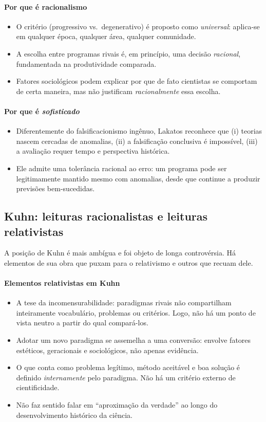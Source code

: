 \documentclass[9pt,a4paper]{extarticle}
\newcommand{\impt}[1]{\textcolor{important}{#1}}
\newcommand{\ntc}[1]{\textcolor{notice}{#1}}
\begin{document}
\paragraph{Por que é racionalismo}
\begin{itemize}
    \item O critério (progressivo vs.\ degenerativo) é proposto como \emph{universal}: aplica-se em qualquer época, qualquer área, qualquer comunidade.
    \item A escolha entre programas rivais é, em princípio, uma decisão \emph{racional}, fundamentada na produtividade comparada.
    \item Fatores sociológicos podem explicar por que de fato cientistas se comportam de certa maneira, mas não justificam \emph{racionalmente} essa escolha.
\end{itemize}

\paragraph{Por que é \emph{sofisticado}}
\begin{itemize}
    \item Diferentemente do falsificacionismo ingênuo, Lakatos reconhece que (i) teorias nascem cercadas de anomalias, (ii) a falsificação conclusiva é impossível, (iii) a avaliação requer tempo e perspectiva histórica.
    \item Ele admite uma \ntc{tolerância racional} ao erro: um programa pode ser legitimamente mantido mesmo com anomalias, desde que continue a produzir previsões bem-sucedidas.
\end{itemize}

\subsection{Kuhn: leituras racionalistas e leituras relativistas}

A posição de Kuhn é mais ambígua e foi objeto de longa controvérsia. Há elementos de sua obra que puxam para o relativismo e outros que recuam dele.

\paragraph{Elementos relativistas em Kuhn}
\begin{itemize}
    \item A \impt{tese da incomensurabilidade}: paradigmas rivais não compartilham inteiramente vocabulário, problemas ou critérios. Logo, não há um ponto de vista neutro a partir do qual compará-los.
    \item Adotar um novo paradigma se assemelha a uma \ntc{conversão}: envolve fatores estéticos, geracionais e sociológicos, não apenas evidência.
    \item O que conta como problema legítimo, método aceitável e boa solução é definido \emph{internamente} pelo paradigma. Não há um critério externo de cientificidade.
    \item Não faz sentido falar em ``aproximação da verdade'' ao longo do desenvolvimento histórico da ciência.
\end{itemize}
\end{document}
